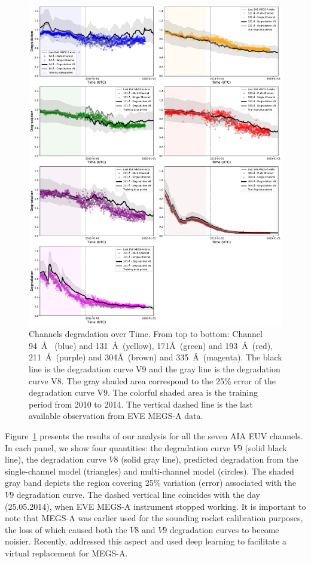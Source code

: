 \documentclass[twocolumn,usenames,dvipsnames]{aastex63}
\begin{document}
\begin{figure}[ht!]
	\centering
		\centering
        \includegraphics[width=\textwidth]{luiz_exp_36_apodize_Degradation_Alternative.pdf} 
        \caption{Channels degradation over Time. From top to bottom: Channel 94~\AA~ (blue) and 131~\AA~(yellow), 171\AA~(green) and 193~\AA~(red), 211~\AA~(purple) and 304\AA~(brown) and 335~\AA~(magenta). The black line is the degradation curve V9 and the gray line is the degradation curve V8. The gray shaded area correspond to the 25\% error of the degradation curve V9. The colorful shaded area is the training period from 2010 to 2014. The vertical dashed line is the last available observation from EVE MEGS-A data.}
        \label{fig:degradation_curve}
\end{figure}

Figure~\ref{fig:degradation_curve} presents the results of our analysis for all the seven AIA EUV channels. In each panel, we show four quantities: the degradation curve $V9$ (solid black line), the degradation curve $V8$ (solid gray line), predicted degradation from the single-channel model (triangles) and multi-channel model (circles). The shaded gray band depicts the region covering 25\% variation (error) associated with the $V9$ degradation curve. The dashed vertical line coincides with the day (25.05.2014), when EVE MEGS-A instrument stopped working. It is important to note that MEGS-A was earlier used for the sounding rocket calibration purposes, the loss of which caused both the $V8$ and $V9$ degradation curves to become noisier. Recently, \citet{Szenicereaaw6548} addressed this aspect and used deep learning to facilitate a virtual replacement for MEGS-A.
\end{document}
